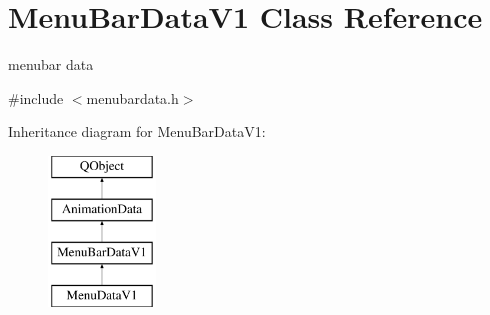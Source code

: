 \hypertarget{class_menu_bar_data_v1}{}\section{Menu\+Bar\+Data\+V1 Class Reference}
\label{class_menu_bar_data_v1}


menubar data  




{\ttfamily \#include $<$menubardata.\+h$>$}

Inheritance diagram for Menu\+Bar\+Data\+V1\+:\begin{figure}[H]
\begin{center}
\leavevmode
\includegraphics[height=4.000000cm]{class_menu_bar_data_v1}
\end{center}
\end{figure}
